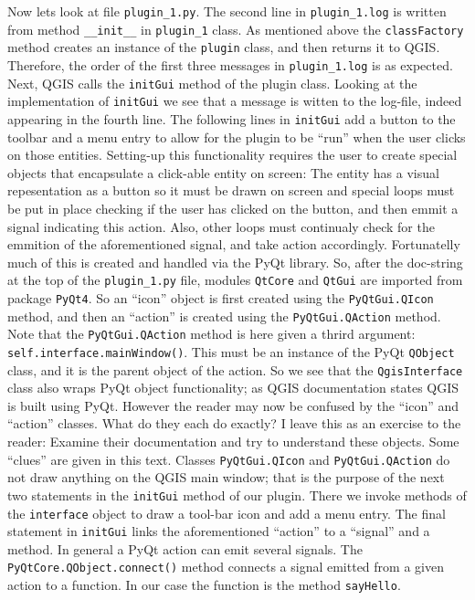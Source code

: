 Now lets look at file \lstinline{plugin_1.py}. The second line in \lstinline{plugin_1.log} is written from method \lstinline{__init__} in \lstinline{plugin_1} class. As mentioned above the \lstinline{classFactory} method creates an instance of the \lstinline{plugin} class, and then returns it to QGIS. Therefore, the order of the first three messages in \lstinline{plugin_1.log} is as expected. Next, QGIS calls the \lstinline{initGui} method of the plugin class. Looking at the implementation of \lstinline{initGui} we see that a message is witten to the log-file, indeed appearing in the fourth line. The following lines in \lstinline{initGui} add a button to the toolbar and a menu entry to allow for the plugin to be ``run'' when the user clicks on those entities. Setting-up this functionality requires the user to create special objects that encapsulate a click-able entity on screen: The entity has a visual repesentation as a button so it must be drawn on screen and special loops must be put in place checking if the user has clicked on the button, and then emmit a signal indicating this action. Also, other loops must continualy check for the emmition of the aforementioned signal, and take action accordingly. Fortunatelly much of this is created and handled via the PyQt library. So, after the doc-string at the top of the \lstinline{plugin_1.py} file, modules \lstinline{QtCore} and \lstinline{QtGui} are imported from package \lstinline{PyQt4}. So an ``icon'' object is first created using the \lstinline{PyQtGui.QIcon} method, and then an ``action'' is created using the \lstinline{PyQtGui.QAction} method. Note that the \lstinline{PyQtGui.QAction} method is here given a thrird argument: \lstinline{self.interface.mainWindow()}. This must be an instance of the PyQt \lstinline{QObject} class, and it is the parent object of the action. So we see that the \lstinline{QgisInterface} class also wraps PyQt object functionality; as QGIS documentation states QGIS is built using PyQt. However the reader may now be confused by the ``icon'' and ``action'' classes. What do they each do exactly? I leave this as an exercise to the reader: Examine their documentation and try to understand these objects. Some ``clues'' are given in this text. Classes \lstinline{PyQtGui.QIcon} and \lstinline{PyQtGui.QAction} do not draw anything on the QGIS main window; that is the purpose of the next two statements in the \lstinline{initGui} method of our plugin. There we invoke methods of the \lstinline{interface} object to draw a tool-bar icon and add a menu entry. The final statement in \lstinline{initGui} links the aforementioned ``action'' to a ``signal'' and a method. In general a PyQt action can emit several signals. The \lstinline{PyQtCore.QObject.connect()} method connects a signal emitted from a given action to a function. In our case the function is the method \lstinline{sayHello}.
